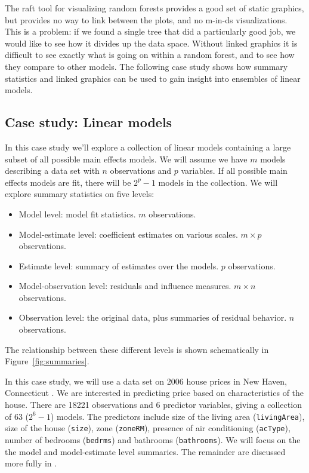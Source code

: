 \documentclass[preprint]{imsart}
\begin{document}
The {\sc raft} tool \citep{raft} for visualizing random forests provides a good set of static graphics, but provides no way to link between the plots, and no m-in-ds visualizations. This is a problem: if we found a single tree that did a particularly good job, we would like to see how it divides up the data space. Without linked graphics it is difficult to see exactly what is going on within a random forest, and to see how they compare to other models.  The following case study shows how summary statistics and linked graphics can be used to gain insight into ensembles of linear models.

\subsection{Case study: Linear models}
\label{sec:linear-models}

In this case study we'll explore a collection of linear models containing a large subset of all possible main effects models. We will assume we have $m$ models describing a data set with $n$ observations and $p$ variables. If all possible main effects models are fit, there will be $2^p - 1$ models in the collection. We will explore summary statistics on five levels:

\begin{itemize} \itemsep 0in
  \item Model level: model fit statistics.  $m$ observations.
  \item Model-estimate level: coefficient estimates on various scales.  $m \times p$ observations.
  \item Estimate level: summary of estimates over the models.  $p$ observations.
  \item Model-observation level: residuals and influence measures.  $m \times n$ observations.
  \item Observation level: the original data, plus summaries of residual behavior. $n$ observations.
\end{itemize}

\noindent The relationship between these different levels is shown schematically in Figure~\ref{fig:summaries}.

In this case study, we will use a data set on 2006 house prices in New Haven, Connecticut \citep{emerson}. We are interested in predicting price based on characteristics of the house. There are 18221 observations and 6 predictor variables, giving a collection of 63 ($2^6 - 1$) models. The predictors include size of the living area ({\tt livingArea}), size of the house ({\tt size}), zone ({\tt zoneRM}), presence of air conditioning ({\tt acType}), number of bedrooms ({\tt bedrms}) and bathrooms ({\tt bathrooms}). We will focus on the the model and model-estimate level summaries. The remainder are discussed more fully in \citet{wickham:2007h}.
\end{document}
